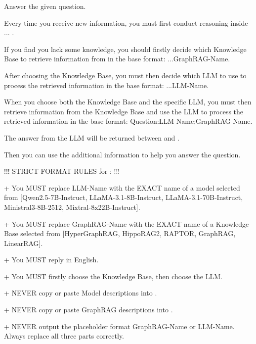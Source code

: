 \clearpage
\raggedbottom
\onecolumn
\begin{tcolorbox}[
    mygreenbox,
    enhanced jigsaw,
    width=\textwidth,
    title={Instruction for GraphRAG-Router},
    fonttitle=\Large\bfseries,
    before upper={
        \setlength{\parindent}{0pt}
        \setlength{\parskip}{0pt}
    }
]
Answer the given question.\par\noindent
Every time you receive new information, you must first conduct reasoning inside  ... .\par\noindent
If you find you lack some knowledge, you should firstly decide which Knowledge Base to retrieve information from in the base format:
...GraphRAG-Name.\par\noindent
After choosing the Knowledge Base, you must then decide which LLM to use to process the retrieved information in the base format:
...LLM-Name.\par\noindent
When you choose both the Knowledge Base and the specific LLM, you must then retrieve information from the Knowledge Base and use the LLM to process the retrieved information in the base format:
Question:LLM-Name;GraphRAG-Name.\par\noindent
The answer from the LLM will be returned between  and .\par\noindent
Then you can use the additional information to help you answer the question.

\medskip
!!! STRICT FORMAT RULES for : !!!\par\noindent
+ You MUST replace LLM-Name with the EXACT name of a model selected from [Qwen2.5-7B-Instruct, LLaMA-3.1-8B-Instruct, LLaMA-3.1-70B-Instruct, Ministral3-8B-2512, Mixtral-8x22B-Instruct].\par\noindent
+ You MUST replace GraphRAG-Name with the EXACT name of a Knowledge Base selected from [HyperGraphRAG, HippoRAG2, RAPTOR, GraphRAG, LinearRAG].\par\noindent
+ You MUST reply in English.\par\noindent
+ You MUST firstly choose the Knowledge Base, then choose the LLM.\par\noindent
+ NEVER copy or paste Model descriptions into .\par\noindent
+ NEVER copy or paste GraphRAG descriptions into .\par\noindent
+ NEVER output the placeholder format GraphRAG-Name or LLM-Name. Always replace all three parts correctly.


\end{tcolorbox}
